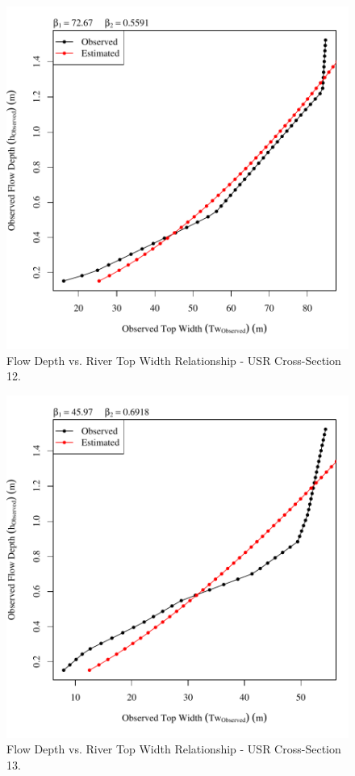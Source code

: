 \begin{center}
\begin{figure}[htbp]
	\includegraphics[width=6in]{"Figures/Results_USR/Survey Tw vs H-Section 12"}
	\caption{Flow Depth vs. River Top Width Relationship - USR Cross-Section 12.}
\end{figure}
\end{center}
\newpage

\begin{center}
\begin{figure}[htbp]
	\includegraphics[width=6in]{"Figures/Results_USR/Survey Tw vs H-Section 13"}
	\caption{Flow Depth vs. River Top Width Relationship - USR Cross-Section 13.}
\end{figure}
\end{center}
\newpage

